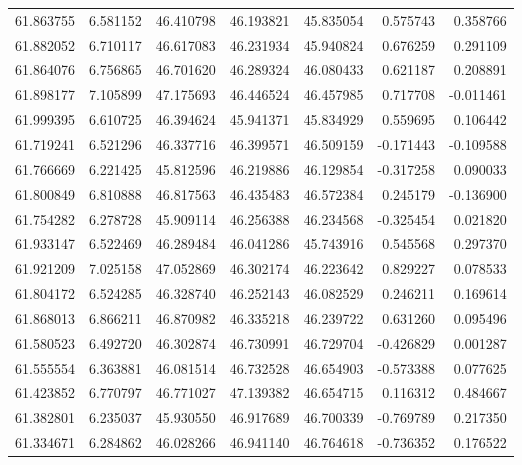 \begin{tabular}{rrrrrrr}
 61.863755 &   6.581152 &         46.410798 &         46.193821 &         45.835054 &  0.575743 &  0.358766 \\
 61.882052 &   6.710117 &         46.617083 &         46.231934 &         45.940824 &  0.676259 &  0.291109 \\
 61.864076 &   6.756865 &         46.701620 &         46.289324 &         46.080433 &  0.621187 &  0.208891 \\
 61.898177 &   7.105899 &         47.175693 &         46.446524 &         46.457985 &  0.717708 & -0.011461 \\
 61.999395 &   6.610725 &         46.394624 &         45.941371 &         45.834929 &  0.559695 &  0.106442 \\
 61.719241 &   6.521296 &         46.337716 &         46.399571 &         46.509159 & -0.171443 & -0.109588 \\
 61.766669 &   6.221425 &         45.812596 &         46.219886 &         46.129854 & -0.317258 &  0.090033 \\
 61.800849 &   6.810888 &         46.817563 &         46.435483 &         46.572384 &  0.245179 & -0.136900 \\
 61.754282 &   6.278728 &         45.909114 &         46.256388 &         46.234568 & -0.325454 &  0.021820 \\
 61.933147 &   6.522469 &         46.289484 &         46.041286 &         45.743916 &  0.545568 &  0.297370 \\
 61.921209 &   7.025158 &         47.052869 &         46.302174 &         46.223642 &  0.829227 &  0.078533 \\
 61.804172 &   6.524285 &         46.328740 &         46.252143 &         46.082529 &  0.246211 &  0.169614 \\
 61.868013 &   6.866211 &         46.870982 &         46.335218 &         46.239722 &  0.631260 &  0.095496 \\
 61.580523 &   6.492720 &         46.302874 &         46.730991 &         46.729704 & -0.426829 &  0.001287 \\
 61.555554 &   6.363881 &         46.081514 &         46.732528 &         46.654903 & -0.573388 &  0.077625 \\
 61.423852 &   6.770797 &         46.771027 &         47.139382 &         46.654715 &  0.116312 &  0.484667 \\
 61.382801 &   6.235037 &         45.930550 &         46.917689 &         46.700339 & -0.769789 &  0.217350 \\
 61.334671 &   6.284862 &         46.028266 &         46.941140 &         46.764618 & -0.736352 &  0.176522 \\

\end{tabular}

